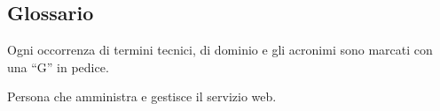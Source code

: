	\subsection{Glossario}
	Ogni occorrenza di termini tecnici, di dominio e gli acronimi sono marcati con una ``G'' in pedice.

	Persona che amministra e gestisce il servizio web.

